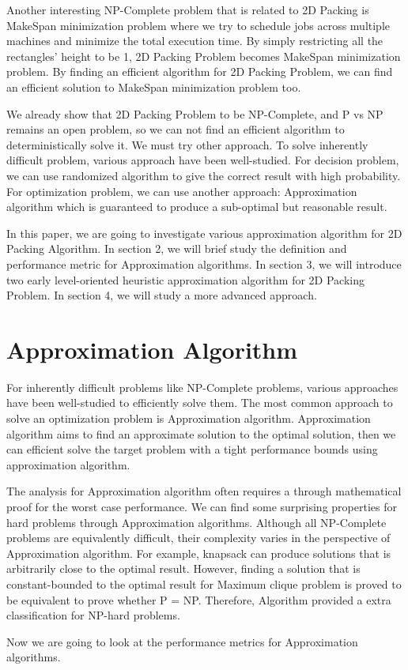\documentclass[sigplan,screen,nonacm]{acmart}\settopmatter{printfolios=true,printccs=false,printacmref=false}
\begin{document}
Another interesting NP-Complete problem that is related to 2D Packing is MakeSpan minimization problem\cite{graham1966bounds} where we try to schedule jobs across multiple machines and minimize the total execution time. By simply restricting all the rectangles' height to be 1, 2D Packing Problem becomes MakeSpan minimization problem. By finding an efficient algorithm for 2D Packing Problem, we can find an efficient solution to MakeSpan minimization problem too. \par
We already show that 2D Packing Problem to be NP-Complete, and P vs NP remains an open problem, so we can not find an efficient algorithm to deterministically solve it. We must try other approach. To solve inherently difficult problem, various approach have been well-studied. For decision problem, we can use randomized algorithm to give the correct result with high probability. For optimization problem, we can use another approach: Approximation algorithm\cite{garey1976approximation} which is guaranteed to produce a sub-optimal but reasonable result. \par
In this paper, we are going to investigate various approximation algorithm for 2D Packing Algorithm. In section 2, we will brief study the definition and performance metric for Approximation algorithms. In section 3, we will introduce two early level-oriented heuristic approximation algorithm\cite{coffman1980performance} for 2D Packing Problem. In section 4,  we will study a more advanced approach\cite{steinberg1997strip}.
\section{Approximation Algorithm}
For inherently difficult problems like NP-Complete problems, various approaches have been well-studied to efficiently solve them. The most common approach to solve an optimization problem is Approximation algorithm. Approximation algorithm aims to find an approximate solution to the optimal solution, then we can efficient solve the target problem with a tight performance bounds using approximation algorithm.\par
The analysis for Approximation algorithm often requires a through mathematical proof for the worst case performance. We can find some surprising properties for hard problems through Approximation algorithms. Although all NP-Complete problems are equivalently difficult, their complexity varies in the perspective of Approximation algorithm. For example, knapsack can produce solutions that is arbitrarily close to the optimal result. However, finding a solution that is constant-bounded to the optimal result for Maximum clique problem is proved to be equivalent to prove whether P = NP. Therefore, Algorithm provided a extra classification for NP-hard problems.\par
Now we are going to look at the performance metrics for Approximation algorithms.
\end{document}
